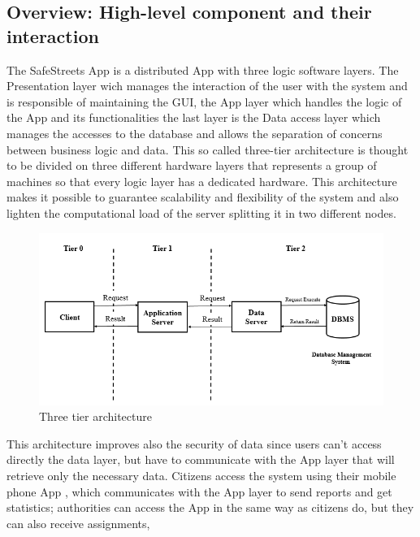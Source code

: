 \subsection{Overview: High-level component and their interaction}
The SafeStreets App is a distributed App with three logic software layers.
The Presentation layer wich manages the interaction of the user with the system and is responsible of maintaining the GUI, 
the App layer which handles the logic of the App and its functionalities the last layer is the Data access layer which manages the accesses to the database and allows the separation of concerns between business logic and data.
This so called three-tier architecture is thought to be divided on three different hardware layers that represents a group of machines so that every logic layer has a dedicated hardware. This architecture makes it possible to guarantee scalability and flexibility of the system and also lighten the computational load of the server splitting it in two different nodes.
\begin{figure}[H]
\centering
\includegraphics[width=\textwidth]{Images/3tier.png}
\caption{\label{fig:ComWI}Three tier architecture}
\end{figure}
This architecture improves also the security of data since users can’t access directly the data layer, but have to
communicate with the App layer that will retrieve only the necessary data. Citizens access the system using
their mobile phone App , which communicates with the App layer to send reports and get statistics;
authorities can access the App in the same way as citizens do, but they can also receive assignments,
